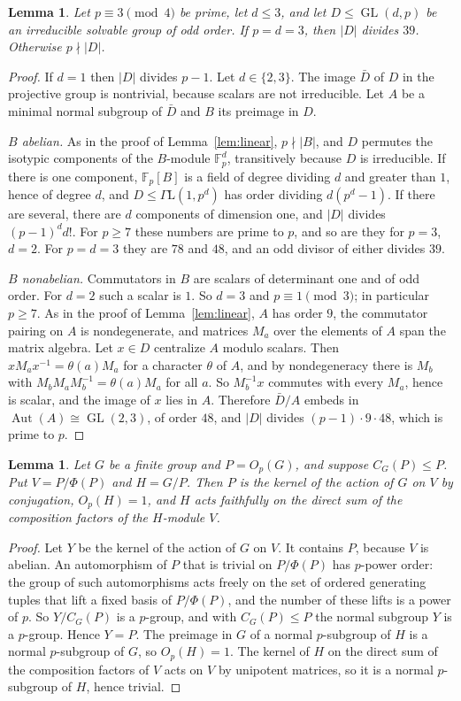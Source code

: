 \documentclass[11pt]{amsart}
\newtheorem{lemma}[theorem]{Lemma}
\theoremstyle{definition}
\theoremstyle{remark}
\newcommand{\F}{\mathbb{F}}
\newcommand{\Aut}{\operatorname{Aut}}
\newcommand{\GL}{\operatorname{GL}}
\newcommand{\GaL}{\Gamma\mathrm{L}}
\begin{document}
\begin{lemma}\label{lem:smalllinear}
Let $p\equiv3\pmod4$ be prime, let $d\le3$, and let $D\le\GL(d,p)$ be an irreducible solvable group of odd order. If $p=d=3$, then $|D|$ divides $39$. Otherwise $p\nmid|D|$.
\end{lemma}
\begin{proof}
If $d=1$ then $|D|$ divides $p-1$. Let $d\in\{2,3\}$. The image $\bar D$ of $D$ in the projective group is nontrivial, because scalars are not irreducible. Let $A$ be a minimal normal subgroup of $\bar D$ and $B$ its preimage in $D$.

\emph{$B$ abelian.} As in the proof of Lemma~\ref{lem:linear}, $p\nmid|B|$, and $D$ permutes the isotypic components of the $B$-module $\F_p^d$, transitively because $D$ is irreducible. If there is one component, $\F_p[B]$ is a field of degree dividing $d$ and greater than $1$, hence of degree $d$, and $D\le\GaL(1,p^d)$ has order dividing $d(p^d-1)$. If there are several, there are $d$ components of dimension one, and $|D|$ divides $(p-1)^dd!$. For $p\ge7$ these numbers are prime to $p$, and so are they for $p=3$, $d=2$. For $p=d=3$ they are $78$ and $48$, and an odd divisor of either divides $39$.

\emph{$B$ nonabelian.} Commutators in $B$ are scalars of determinant one and of odd order. For $d=2$ such a scalar is $1$. So $d=3$ and $p\equiv1\pmod3$; in particular $p\ge7$. As in the proof of Lemma~\ref{lem:linear}, $A$ has order $9$, the commutator pairing on $A$ is nondegenerate, and matrices $M_a$ over the elements of $A$ span the matrix algebra. Let $x\in D$ centralize $A$ modulo scalars. Then $xM_ax^{-1}=\theta(a)M_a$ for a character $\theta$ of $A$, and by nondegeneracy there is $M_b$ with $M_bM_aM_b^{-1}=\theta(a)M_a$ for all $a$. So $M_b^{-1}x$ commutes with every $M_a$, hence is scalar, and the image of $x$ lies in $A$. Therefore $\bar D/A$ embeds in $\Aut(A)\cong\GL(2,3)$, of order $48$, and $|D|$ divides $(p-1)\cdot9\cdot48$, which is prime to $p$.
\end{proof}

\begin{lemma}\label{lem:frattini}
Let $G$ be a finite group and $P=O_p(G)$, and suppose $C_G(P)\le P$. Put $V=P/\Phi(P)$ and $H=G/P$. Then $P$ is the kernel of the action of $G$ on $V$ by conjugation, $O_p(H)=1$, and $H$ acts faithfully on the direct sum of the composition factors of the $H$-module $V$.
\end{lemma}
\begin{proof}
Let $Y$ be the kernel of the action of $G$ on $V$. It contains $P$, because $V$ is abelian. An automorphism of $P$ that is trivial on $P/\Phi(P)$ has $p$-power order: the group of such automorphisms acts freely on the set of ordered generating tuples that lift a fixed basis of $P/\Phi(P)$, and the number of these lifts is a power of $p$. So $Y/C_G(P)$ is a $p$-group, and with $C_G(P)\le P$ the normal subgroup $Y$ is a $p$-group. Hence $Y=P$. The preimage in $G$ of a normal $p$-subgroup of $H$ is a normal $p$-subgroup of $G$, so $O_p(H)=1$. The kernel of $H$ on the direct sum of the composition factors of $V$ acts on $V$ by unipotent matrices, so it is a normal $p$-subgroup of $H$, hence trivial.
\end{proof}
\end{document}
